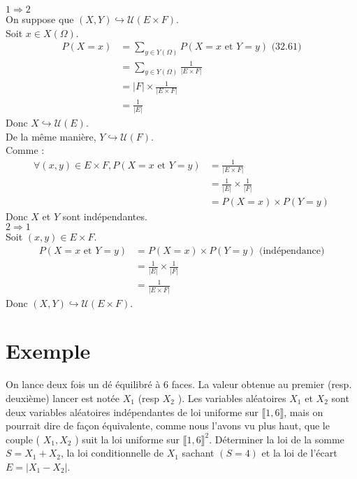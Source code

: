 \documentclass[../main.tex]{subfiles}
\begin{document}
$\boxed{1\Rightarrow 2}$ \\
On suppose que $(X, Y) \hookrightarrow \mathcal{U}(E \times F)$. \\
Soit $x\in X(\Omega)$. 
\begin{align*}
    P(X = x) &= \sum_{y\in Y(\Omega)} P(X = x \text{ et } Y = y) \text{ (32.61)} \\
    &= \sum_{y\in Y(\Omega)} \frac{1}{|E\times F|} \\
    &= |F| \times \frac{1}{|E\times F|} \\
    &= \frac{1}{|E|}
\end{align*}
Donc $X \hookrightarrow \mathcal{U}(E)$. \\
De la même manière, $Y \hookrightarrow \mathcal{U}(F)$. \\
Comme : 
\begin{align*}
    \forall (x, y)\in E\times F, P(X = x \text{ et } Y = y) &= \frac{1}{|E\times F|} \\
    &= \frac{1}{|E|} \times \frac{1}{|F|} \\
    &= P(X = x) \times P(Y = y)
\end{align*}
Donc $X$ et $Y$ sont indépendantes. \\

$\boxed{2\Rightarrow 1}$ \\
Soit $(x, y)\in E\times F$. 
\begin{align*}
    P(X = x \text{ et } Y = y) &= P(X = x) \times P(Y = y) \text{ (indépendance)} \\
    &= \frac{1}{|E|} \times \frac{1}{|F|} \\
    &= \frac{1}{|E\times F|}
\end{align*}
Donc $(X, Y) \hookrightarrow \mathcal{U}(E\times F)$.

\section{Exemple}
\begin{tcolorbox}[title=Exemple 32.66, title filled=false, colframe=darkgreen, colback=darkgreen!10!white]
    On lance deux fois un dé équilibré à 6 faces. La valeur obtenue au premier (resp. deuxième) lancer est notée $X_1$ (resp $X_2$ ). Les variables aléatoires $X_1$ et $X_2$ sont deux variables aléatoires indépendantes de loi uniforme sur $\llbracket 1,6 \rrbracket$, mais on pourrait dire de façon équivalente, comme nous l'avons vu plus haut, que le couple ( $X_1, X_2$ ) suit la loi uniforme sur $\llbracket 1,6 \rrbracket^2$. Déterminer la loi de la somme $S=X_1+X_2$, la loi conditionnelle de $X_1$ sachant $(S=4)$ et la loi de l'écart $E=\left|X_1-X_2\right|$.
\end{tcolorbox}
\end{document}
